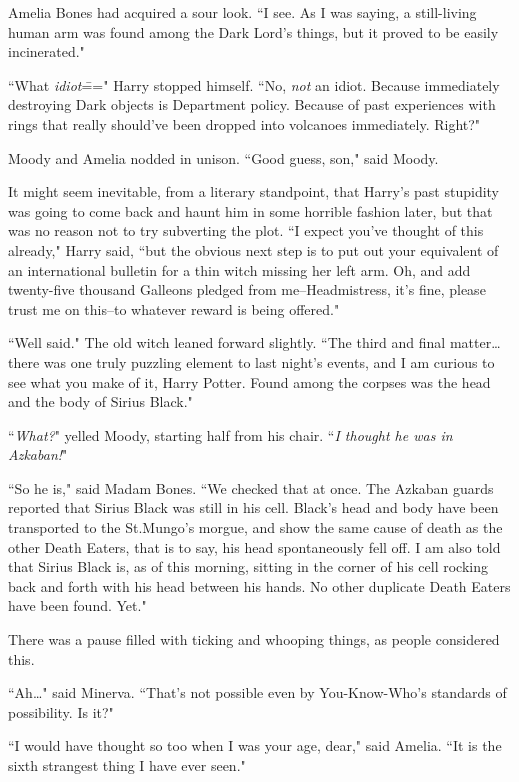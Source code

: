 Amelia Bones had acquired a sour look. ``I see. As I was saying, a still-living human arm was found among the Dark Lord's things, but it proved to be easily incinerated."

``What \emph{idiot}\===" Harry stopped himself. ``No, \emph{not} an idiot. Because immediately destroying Dark objects is Department policy. Because of past experiences with rings that really should've been dropped into volcanoes immediately. Right?"

Moody and Amelia nodded in unison. ``Good guess, son," said Moody.

It might seem inevitable, from a literary standpoint, that Harry's past stupidity was going to come back and haunt him in some horrible fashion later, but that was no reason not to try subverting the plot. ``I expect you've thought of this already," Harry said, ``but the obvious next step is to put out your equivalent of an international bulletin for a thin witch missing her left arm. Oh, and add twenty-five thousand Galleons pledged from me\---Headmistress, it's fine, please trust me on this\---to whatever reward is being offered."

``Well said." The old witch leaned forward slightly. ``The third and final matter{\ldots} there was one truly puzzling element to last night's events, and I am curious to see what you make of it, Harry Potter. Found among the corpses was the head and the body of Sirius Black."

``\emph{What?}" yelled Moody, starting half from his chair. ``\emph{I thought he was in Azkaban!}"

``So he is," said Madam Bones. ``We checked that at once. The Azkaban guards reported that Sirius Black was still in his cell. Black's head and body have been transported to the St.\?Mungo's morgue, and show the same cause of death as the other Death Eaters, that is to say, his head spontaneously fell off. I am also told that Sirius Black is, as of this morning, sitting in the corner of his cell rocking back and forth with his head between his hands. No other duplicate Death Eaters have been found. Yet."

There was a pause filled with ticking and whooping things, as people considered this.

``Ah{\ldots}" said Minerva. ``That's not possible even by You-Know-Who's standards of possibility. Is it?"

``I would have thought so too when I was your age, dear," said Amelia. ``It is the sixth strangest thing I have ever seen."

